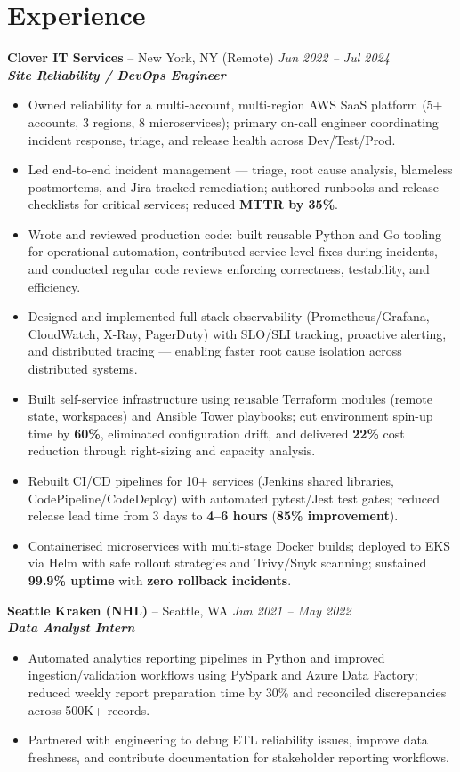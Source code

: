 \documentclass[10pt,a4paper]{article}
\newcommand{\jobentry}[4]{%
  \Needspace{3\baselineskip}%
  \textbf{#1} -- #2 \hfill \textit{#3}\\[-0.15em]
  \textit{#4}\\[-0.25em]
}
\begin{document}
\section*{Experience}
\jobentry{Clover IT Services}{New York, NY (Remote)}{Jun 2022 -- Jul 2024}{\textbf{\textit{Site Reliability / DevOps Engineer}}}
\begin{itemize}
  \item Owned reliability for a multi-account, multi-region AWS SaaS platform (5+ accounts, 3 regions, 8 microservices); primary on-call engineer coordinating incident response, triage, and release health across Dev/Test/Prod.
  \item Led end-to-end incident management — triage, root cause analysis, blameless postmortems, and Jira-tracked remediation; authored runbooks and release checklists for critical services; reduced \textbf{MTTR by 35\%}.
  \item Wrote and reviewed production code: built reusable Python and Go tooling for operational automation, contributed service-level fixes during incidents, and conducted regular code reviews enforcing correctness, testability, and efficiency.
  \item Designed and implemented full-stack observability (Prometheus/Grafana, CloudWatch, X-Ray, PagerDuty) with SLO/SLI tracking, proactive alerting, and distributed tracing — enabling faster root cause isolation across distributed systems.
  \item Built self-service infrastructure using reusable Terraform modules (remote state, workspaces) and Ansible Tower playbooks; cut environment spin-up time by \textbf{60\%}, eliminated configuration drift, and delivered \textbf{22\%} cost reduction through right-sizing and capacity analysis.
  \item Rebuilt CI/CD pipelines for 10+ services (Jenkins shared libraries, CodePipeline/CodeDeploy) with automated pytest/Jest test gates; reduced release lead time from 3 days to \textbf{4--6 hours} (\textbf{85\% improvement}).
  \item Containerised microservices with multi-stage Docker builds; deployed to EKS via Helm with safe rollout strategies and Trivy/Snyk scanning; sustained \textbf{99.9\% uptime} with \textbf{zero rollback incidents}.
\end{itemize}

\jobentry{Seattle Kraken (NHL)}{Seattle, WA}{Jun 2021 -- May 2022}{\textbf{\textit{Data Analyst Intern}}}
\begin{itemize}
  \item Automated analytics reporting pipelines in Python and improved ingestion/validation workflows using PySpark and Azure Data Factory; reduced weekly report preparation time by 30\% and reconciled discrepancies across 500K+ records.
  \item Partnered with engineering to debug ETL reliability issues, improve data freshness, and contribute documentation for stakeholder reporting workflows.
\end{itemize}
\end{document}
